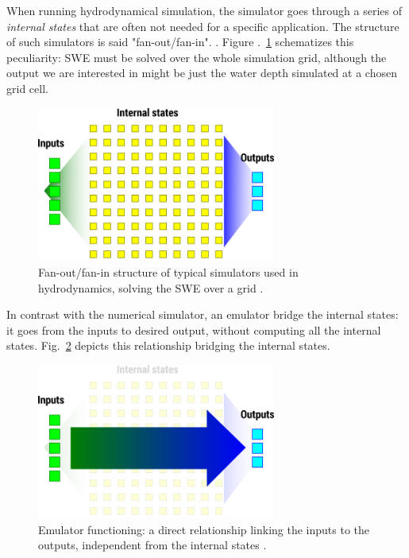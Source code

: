 When running hydrodynamical simulation, the simulator goes through a series of \emph{internal states} that are often not needed for a specific application. The structure of such simulators is said "fan-out/fan-in". \autocite{carbajal_emumore_2017}. Figure .~\ref{fig:simulation} schematizes this peculiarity: SWE must be solved over the whole simulation grid, although the output we are interested in might be just the water depth simulated at a chosen grid cell.

\begin{figure}[h]
  \centering
  \includegraphics[width=0.7\textwidth]{Figures/simulation.png}
  \caption{Fan-out/fan-in structure of typical simulators used in hydrodynamics, solving the SWE over a grid \autocite{carbajal_emumore_2017}.}
  \label{fig:simulation}
\end{figure}

In contrast with the numerical simulator, an emulator bridge the internal states: it goes from the inputs to desired output, without computing all the internal states.  Fig.~\ref{fig:emulation} depicts this relationship bridging the internal states.

\begin{figure}[h]
  \centering
  \includegraphics[width=0.7\textwidth]{Figures/emulation.png}
  \caption{Emulator functioning: a direct relationship linking the inputs to the outputs, independent from the internal states \autocite{carbajal_emumore_2017}.}
  \label{fig:emulation}
\end{figure}

